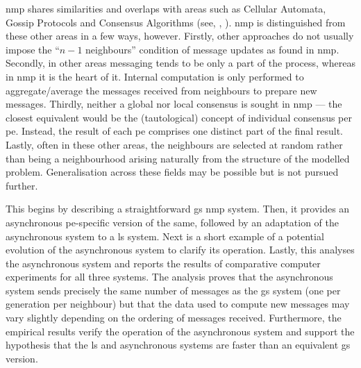 \Gls{nmp} shares similarities and overlaps with areas such as Cellular Automata, Gossip Protocols and Consensus Algorithms (see, \eg{}, \cite{Deserable2012,Hollander2015}).  \Gls{nmp} is distinguished from these other areas in a few ways, however.  Firstly, other approaches do not usually impose the ``\(n - 1\) neighbours'' condition of message updates as found in \gls{nmp}.  Secondly, in other areas messaging tends to be only a part of the process, whereas in \gls{nmp} it is the heart of it.  Internal computation is only performed to aggregate/average the messages received from neighbours to prepare new messages.  Thirdly, neither a global nor local consensus is sought in \gls{nmp} --- the closest equivalent would be the (tautological) concept of individual consensus per \gls{pe}.  Instead, the result of each \gls{pe} comprises one distinct part of the final result.  Lastly, often in these other areas, the neighbours are selected at random rather than being a neighbourhood arising naturally from the structure of the modelled problem.  Generalisation across these fields may be possible but is not pursued further.

This  begins by describing a straightforward \gls{gs} \gls{nmp} system.  Then, it provides an asynchronous \gls{pe}-specific version of the same, followed by an adaptation of the asynchronous system to a \gls{ls} system. Next is a short example of a potential evolution of the asynchronous system to clarify its operation.  Lastly, this  analyses the asynchronous system and reports the results of comparative computer experiments for all three systems.  The analysis proves that the asynchronous system sends precisely the same number of messages as the \gls{gs} system (one per generation per neighbour) but that the data used to compute new messages may vary slightly depending on the ordering of messages received.  Furthermore, the empirical results verify the operation of the asynchronous system and support the hypothesis that the \gls{ls} and asynchronous systems are faster than an equivalent \gls{gs} version.


